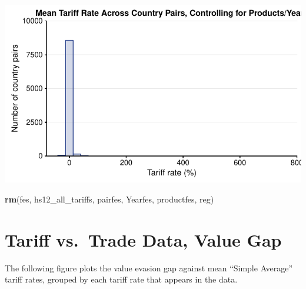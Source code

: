 \documentclass[10pt,]{article}
\newenvironment{Shaded}{\begin{snugshade}}{\end{snugshade}}
\newcommand{\KeywordTok}[1]{\textcolor[rgb]{0.13,0.29,0.53}{\textbf{{#1}}}}
\newcommand{\NormalTok}[1]{{#1}}
\begin{document}
\begin{center}\includegraphics{Figs/tariff_summary-12} \end{center}

\begin{Shaded}
\begin{Highlighting}[]
\KeywordTok{rm}\NormalTok{(fes, hs12_all_tariffs, pairfes, Yearfes, productfes, reg)}
\end{Highlighting}
\end{Shaded}

\section{Tariff vs.~Trade Data, Value
Gap}\label{tariff-vs.trade-data-value-gap}

The following figure plots the value evasion gap against mean ``Simple
Average'' tariff rates, grouped by each tariff rate that appears in the
data.
\end{document}
